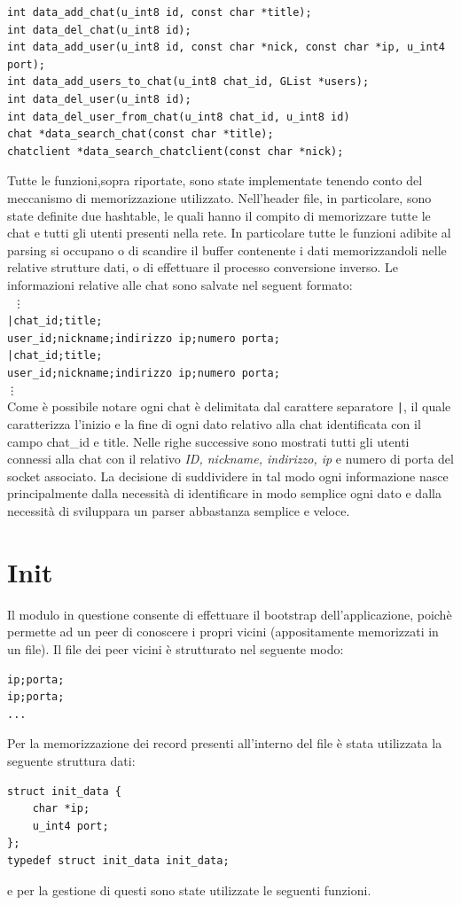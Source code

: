 \begin{lstlisting}
int data_add_chat(u_int8 id, const char *title);
int data_del_chat(u_int8 id);
int data_add_user(u_int8 id, const char *nick, const char *ip, u_int4 port);
int data_add_users_to_chat(u_int8 chat_id, GList *users);
int data_del_user(u_int8 id);
int data_del_user_from_chat(u_int8 chat_id, u_int8 id)
chat *data_search_chat(const char *title);
chatclient *data_search_chatclient(const char *nick);
\end{lstlisting}
Tutte le funzioni,sopra riportate, sono state implementate tenendo conto del meccanismo di memorizzazione utilizzato. Nell'header file, in particolare, sono state definite due hashtable, le quali hanno il compito di memorizzare tutte le chat e tutti gli utenti presenti nella rete. In particolare tutte le funzioni adibite al parsing si occupano o di scandire il buffer contenente i dati memorizzandoli nelle relative strutture dati, o di effettuare il processo conversione inverso. Le informazioni relative alle chat sono salvate nel seguent formato:\\
\texttt{
\vdots\\
		|chat\_id;title;\\
		user\_id;nickname;indirizzo ip;numero porta;\\
		|chat\_id;title;\\
		user\_id;nickname;indirizzo ip;numero porta;\\
\vdots\\
}
Come è possibile notare ogni chat è delimitata dal carattere separatore \texttt{|}, il quale caratterizza l'inizio e la fine di ogni dato relativo alla chat identificata con il campo chat\_id e title. Nelle righe successive sono mostrati tutti gli utenti connessi alla chat con il relativo \textit{ID, nickname, indirizzo, ip} e numero di porta del socket associato.
La decisione di suddividere in tal modo ogni informazione nasce principalmente dalla necessità di identificare in modo semplice ogni dato e dalla necessità di sviluppara un parser abbastanza semplice e veloce.  

\section{Init}
Il modulo in questione consente di effettuare il bootstrap dell'applicazione, poichè permette ad un peer di conoscere i propri vicini (appositamente memorizzati in un file). Il file dei peer vicini è strutturato nel seguente modo:
\begin{lstlisting}
ip;porta;
ip;porta;
...
\end{lstlisting}
Per la memorizzazione dei record presenti all'interno del file è stata utilizzata la seguente struttura dati:
\begin{lstlisting}
struct init_data {
	char *ip;
	u_int4 port;
};
typedef struct init_data init_data;
\end{lstlisting}
e per la gestione di questi sono state utilizzate le seguenti funzioni.
